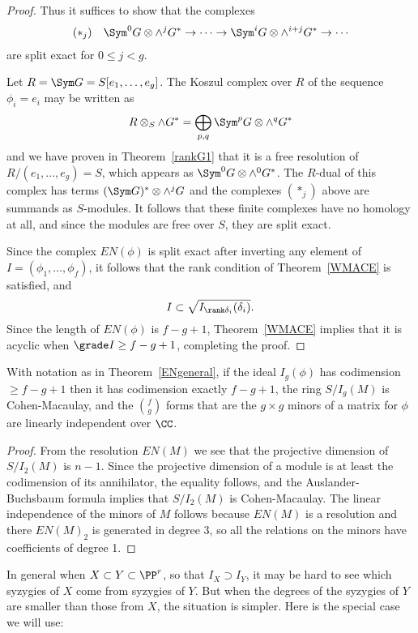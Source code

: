\begin{proof}
Thus it suffices to show that the complexes
$$
\begin{aligned}
 (*_{j}) \quad \Sym^{0}G\otimes\wedge^{j}G^{*}\to\cdots \to \Sym^{i}G \otimes  \wedge^{i+j}G^{*}  \to \cdots
\end{aligned}
$$
are split exact for $0\leq j<g$.

Let $R = \Sym G = S[e_{1}, \dots, e_{g}]$. The Koszul complex over $R$ of the sequence $\phi_{i} = e_{i}$
may be written as
$$
R\otimes_{S} \wedge G^* = \bigoplus_{p,q}\Sym^{p}G\otimes\wedge^{q}G^*
$$
and we have proven in Theorem~\ref{rankG1} that it is a free resolution of $R/(e_1, \dots, e_g)=S$, which appears
as $\Sym^{0}G\otimes \wedge^{0}G^*$. The $R$-dual of this complex has terms
$(\Sym G)^*\otimes\wedge^{j}G$
and the complexes $(*_{j})$ above are summands as $S$-modules. It follows that these finite
complexes have no homology at all, and since the modules are free over $S$, they are split exact.

Since the 
complex $EN(\phi)$ is split exact after inverting any element of $I = (\phi_{1}, \dots, \phi_{f})$, it follows that 
the rank condition of Theorem~\ref{WMACE} is satisfied, and
$$
I \subset \sqrt{I_{\rank \delta_{i}}(\delta_{i})}. 
$$
Since the length of $EN(\phi)$  is $f-g+1$, Theorem~\ref{WMACE} implies that
it is acyclic when $\grade I\geq f-g+1$, completing the proof.
\end{proof}

\begin{corollary}\label{E-N cor}
With notation as in Theorem~\ref{ENgeneral}, if the ideal $I_g(\phi)$ has codimension $\geq f-g+1$ then it has
codimension exactly $f-g+1$, the ring $S/I_g(M)$ is Cohen-Macaulay, and the $\binom{f}{g}$ forms
that are the $g\times g$ minors of a matrix for $\phi$ are linearly independent over $\CC$.
\end{corollary}

\begin{proof}
From the resolution $EN(M)$ we see that the projective dimension of $S/I_2(M)$ is $n-1$. Since the projective dimension of a module
is at least the codimension of its annihilator, the equality follows, and the Auslander-Buchsbaum formula implies that $S/I_2(M)$ is 
Cohen-Macaulay. The linear independence of the minors of $M$ follows because $EN(M)$ is a resolution and there
$EN(M)_2$ is generated in degree 3, so all the relations on the minors have coefficients of degree 1.
\end{proof}


In general when $X\subset Y\subset \PP^r$, so that $I_X \supset I_Y$, it may be hard to see which syzygies of $X$ come
from syzygies of $Y$. But when the degrees of the syzygies of $Y$ are smaller than those from $X$, the situation is simpler.
Here is the special case we will use:

